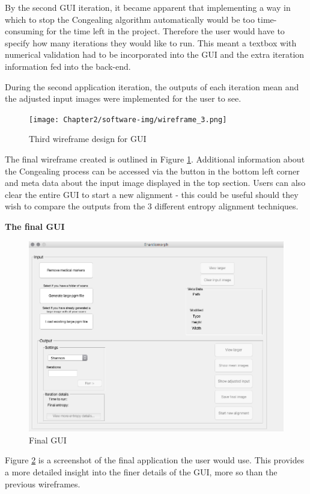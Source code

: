 By the second \acrshort{GUI} iteration, it became apparent that implementing a way in which to stop the \Gls{Congealing} algorithm automatically would be too time-consuming for the time left in the project. Therefore the user would have to specify how many iterations they would like to run. This meant a textbox with numerical validation had to be incorporated into the \acrshort{GUI} and the extra iteration information fed into the back-end.

During the second application iteration, the outputs of each iteration mean and the adjusted input images were implemented for the user to see.

\begin{figure}[H]
  \center
  \texttt{[image: Chapter2/software-img/wireframe\_3.png]}
  \caption{Third wireframe design for GUI}
  \label{fig:wireframe3}
\end{figure}

The final wireframe created is outlined in Figure \ref{fig:wireframe3}. Additional information  about the \Gls{Congealing} process can be accessed via the button in the bottom left corner and meta data about the input image displayed in the top section. Users can also clear the entire \acrshort{GUI} to start a new alignment - this could be useful should they wish to compare the outputs from the 3 different entropy alignment techniques.

\vspace{3cm}
\noindent \textbf{The final \acrshort{GUI}}

\begin{figure}[H]
  \center
  \includegraphics[scale=0.5]{Chapter2/software-img/final_gui.png}
  \caption{Final GUI}
  \label{fig:final_gui}
\end{figure}

Figure \ref{fig:final_gui} is a screenshot of the final application the user would use. This provides a more detailed insight into the finer details of the \acrshort{GUI}, more so than the previous wireframes.
